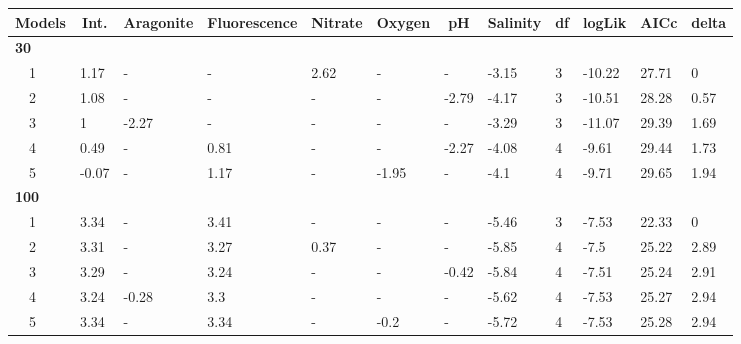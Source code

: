 \documentclass[letterpaper,12pt]{article}\usepackage[]{graphicx}\usepackage[]{color}
\begin{document}
\begin{landscape}
\begin{table}[!tbp]
{\begin{center}
\begin{tabular}{llllllllllll}
\hline\hline
\multicolumn{1}{l}{Models}&\multicolumn{1}{c}{Int.}&\multicolumn{1}{c}{Aragonite}&\multicolumn{1}{c}{Fluorescence}&\multicolumn{1}{c}{Nitrate}&\multicolumn{1}{c}{Oxygen}&\multicolumn{1}{c}{pH}&\multicolumn{1}{c}{Salinity}&\multicolumn{1}{c}{df}&\multicolumn{1}{c}{logLik}&\multicolumn{1}{c}{AICc}&\multicolumn{1}{c}{delta}\tabularnewline
\hline
{\bfseries 30}&&&&&&&&&&&\tabularnewline
~~1&1.17&-&-&2.62&-&-&-3.15&3&-10.22&27.71&0\tabularnewline
~~2&1.08&-&-&-&-&-2.79&-4.17&3&-10.51&28.28&0.57\tabularnewline
~~3&1&-2.27&-&-&-&-&-3.29&3&-11.07&29.39&1.69\tabularnewline
~~4&0.49&-&0.81&-&-&-2.27&-4.08&4&-9.61&29.44&1.73\tabularnewline
~~5&-0.07&-&1.17&-&-1.95&-&-4.1&4&-9.71&29.65&1.94\tabularnewline
\hline
{\bfseries 100}&&&&&&&&&&&\tabularnewline
~~1&3.34&-&3.41&-&-&-&-5.46&3&-7.53&22.33&0\tabularnewline
~~2&3.31&-&3.27&0.37&-&-&-5.85&4&-7.5&25.22&2.89\tabularnewline
~~3&3.29&-&3.24&-&-&-0.42&-5.84&4&-7.51&25.24&2.91\tabularnewline
~~4&3.24&-0.28&3.3&-&-&-&-5.62&4&-7.53&25.27&2.94\tabularnewline
~~5&3.34&-&3.34&-&-0.2&-&-5.72&4&-7.53&25.28&2.94\tabularnewline
\hline
\end{tabular}\end{center}}
\end{table}

\end{landscape}
\end{document}
